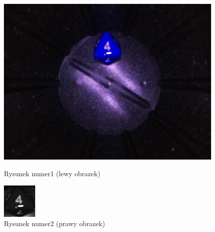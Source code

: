 \begin{figure}[H]
    \centering
    \begin{minipage}[t]{0.45\linewidth}
        \centering
        \includegraphics[width=\linewidth]{chapters/04-czytanie/figures/4raw}
        \caption{Rysunek numer1 (lewy obrazek)}
        \label{fig:4raw}
    \end{minipage}
    \hfill
    \begin{minipage}[t]{0.45\linewidth}
        \centering
        \includegraphics[width=\linewidth]{chapters/04-czytanie/figures/4processed}
        \caption{Rysunek numer2 (prawy obrazek)}
        \label{fig:4proc}
    \end{minipage}
\end{figure}


